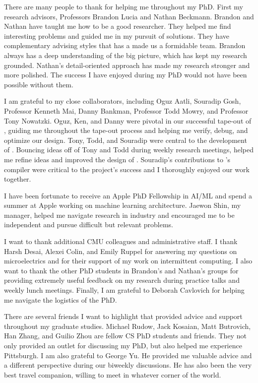 \begin{acknowledgements}
\addchaptertocentry{\acknowledgementname} %
There are many people to thank for helping me throughout my PhD.
% 
First my research advisors, Professors Brandon Lucia and Nathan Beckmann.
% 
Brandon and Nathan have taught me how to be a good researcher.
% 
They helped me find interesting problems and guided me in my pursuit of solutions.
% 
They have complementary advising styles that has a made us a formidable team.
% 
Brandon always has a deep understanding of the big picture, which has kept my research grounded.
% 
Nathan's detail-oriented approach has made my research stronger and more polished.
% 
The success I have enjoyed during my PhD would not have been possible without them.

I am grateful to my close collaborators, including Oguz Aatli, Souradip Gosh, Professor Kenneth Mai, Danny Bankman, Professor Todd Mowry, and Professor Tony Nowatzki.
%
Oguz, Ken, and Danny were pivotal in our successful tape-out of \manic, guiding me throughout the tape-out process and helping me verify, debug, and optimize our design.
% 
Tony, Todd, and Souradip were central to the development of \riptide.
% 
Bouncing ideas off of Tony and Todd during weekly research meetings, helped me refine ideas and improved the design of \riptide.
% 
Souradip's contributions to \riptide's compiler were critical to the project's success and I thoroughly enjoyed our work together.

I have been fortunate to receive an Apple PhD Fellowship in AI/ML and spend a summer at Apple working on machine learning architecture.
% 
Jaewon Shin, my manager, helped me navigate research in industry and encouraged me to be independent and pursue difficult but relevant problems.

I want to thank additional CMU colleagues and administrative staff.
% 
I thank Harsh Desai, Alexei Colin, and Emily Ruppel for answering my questions on microelectrics and for their support of my work on intermittent computing.
% 
I also want to thank the other PhD students in Brandon's and Nathan's groups for providing extremely useful feedback on my research during practice talks and weekly lunch meetings.
% 
Finally, I am grateful to Deborah Cavlovich for helping me navigate the logistics of the PhD.

There are several friends I want to highlight that provided advice and support throughout my graduate studies.
% 
Michael Rudow, Jack Kosaian, Matt Butrovich, Han Zhang, and Guilio Zhou are fellow CS PhD students and friends. 
% 
They not only provided an outlet for discussing my PhD, but also helped me experience Pittsburgh.
% 
I am also grateful to George Yu.
% 
He provided me valuable advice and a different perspective during our biweekly discussions.
% 
He has also been the very best travel companion, willing to meet in whatever corner of the world.


\end{acknowledgements}
